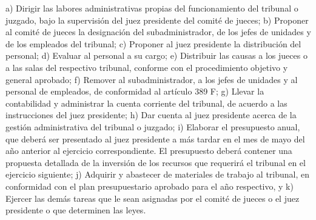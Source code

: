     a) Dirigir las labores administrativas propias del funcionamiento del tribunal o juzgado, bajo la supervisión del juez presidente del comité de jueces;
    b) Proponer al comité de jueces la designación del subadministrador, de los jefes de unidades y de los empleados del tribunal;
    c) Proponer al juez presidente la distribución del personal;
    d) Evaluar al personal a su cargo;
    e) Distribuir las causas a los jueces o a las salas del respectivo tribunal, conforme con el procedimiento objetivo y general aprobado;
    f) Remover al subadministrador, a los jefes de unidades y al personal de empleados, de conformidad al artículo 389 F;
    g) Llevar la contabilidad y administrar la cuenta corriente del tribunal, de acuerdo a las instrucciones del juez presidente;
    h) Dar cuenta al juez presidente acerca de la gestión administrativa del tribunal o juzgado;
    i) Elaborar el presupuesto anual, que deberá ser presentado al juez presidente a más tardar en el mes de mayo del año anterior al ejercicio correspondiente.
    El presupuesto deberá contener una propuesta detallada de la inversión de los recursos que requerirá el tribunal en el ejercicio siguiente;
    j) Adquirir y abastecer de materiales de trabajo al tribunal, en conformidad con el plan presupuestario aprobado para el año respectivo, y
    k) Ejercer las demás tareas que le sean asignadas por el comité de jueces o el juez presidente o que determinen las leyes.

